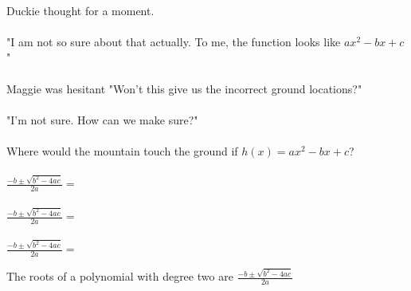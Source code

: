 {\paragraph{} Duckie thought for a moment. 
\paragraph{} "I am not so sure about that actually. To me, the function looks like $ax^2-bx+c$"
\paragraph{} Maggie was hesitant "Won't this give us the incorrect ground locations?" 
\paragraph{} "I'm not sure. How can we make sure?"
\paragraph{} Where would the mountain touch the ground if $h(x)=ax^2-bx+c$?
}
{\paragraph{} $\frac{-b \pm \sqrt{b^2-4ac}}{2a} = $
\paragraph{} $\frac{-b \pm \sqrt{b^2-4ac}}{2a} = $
\paragraph{} $\frac{-b \pm \sqrt{b^2-4ac}}{2a} = $}
{The roots of a polynomial with degree two are $\frac{-b \pm \sqrt{b^2-4ac}}{2a}$}
{}

